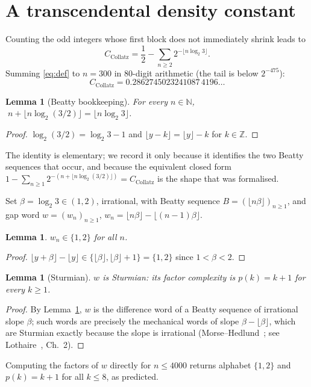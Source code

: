 \documentclass[11pt,a4paper]{article}
\theoremstyle{plain}
\newtheorem{lemma}[theorem]{Lemma}
\theoremstyle{definition}
\newcommand{\CC}{C_{\mathrm{Collatz}}}
\begin{document}
\section{A transcendental density constant}\label{sec:trans}

Counting the odd integers whose first block does not immediately shrink leads to
\begin{equation}\label{eq:def}
  \CC=\frac12-\sum_{n\ge2}2^{-\lfloor n\log_{2}3\rfloor}.
\end{equation}
Summing \eqref{eq:def} to $n=300$ in $80$-digit arithmetic (the tail is below $2^{-475}$):
\[
  \CC=0.2862745023241087\,4196\ldots
\]

\begin{lemma}[Beatty bookkeeping]\label{lem:beatty}
For every $n\in\mathbb{N}$, $\;n+\lfloor n\log_{2}(3/2)\rfloor=\lfloor n\log_{2}3\rfloor$.
\end{lemma}
\begin{proof}
$\log_{2}(3/2)=\log_{2}3-1$ and $\lfloor y-k\rfloor=\lfloor y\rfloor-k$ for $k\in\mathbb{Z}$.
\end{proof}
\noindent The identity is elementary; we record it only because it identifies the two Beatty
sequences that occur, and because the equivalent closed form
$1-\sum_{n\ge1}2^{-(n+\lfloor n\log_{2}(3/2)\rfloor)}=\CC$ is the shape that was formalised.

Set $\beta=\log_{2}3\in(1,2)$, irrational, with Beatty sequence
$B=(\lfloor n\beta\rfloor)_{n\ge1}$, and gap word $w=(w_{n})_{n\ge1}$,
$w_{n}=\lfloor n\beta\rfloor-\lfloor(n-1)\beta\rfloor$.

\begin{lemma}\label{lem:gap}
$w_{n}\in\{1,2\}$ for all $n$.
\end{lemma}
\begin{proof}
$\lfloor y+\beta\rfloor-\lfloor y\rfloor\in\{\lfloor\beta\rfloor,\lfloor\beta\rfloor+1\}
=\{1,2\}$ since $1<\beta<2$.
\end{proof}

\begin{lemma}[Sturmian]\label{lem:sturm}
$w$ is Sturmian: its factor complexity is $p(k)=k+1$ for every $k\ge1$.
\end{lemma}
\begin{proof}
By Lemma~\ref{lem:gap}, $w$ is the difference word of a Beatty sequence of irrational slope
$\beta$; such words are precisely the mechanical words of slope $\beta-\lfloor\beta\rfloor$,
which are Sturmian exactly because the slope is irrational
(Morse--Hedlund~\cite{mh}; see Lothaire~\cite{lothaire}, Ch.~2).
\end{proof}
\noindent Computing the factors of $w$ directly for $n\le4000$ returns alphabet $\{1,2\}$ and
$p(k)=k+1$ for all $k\le8$, as predicted.
\end{document}
